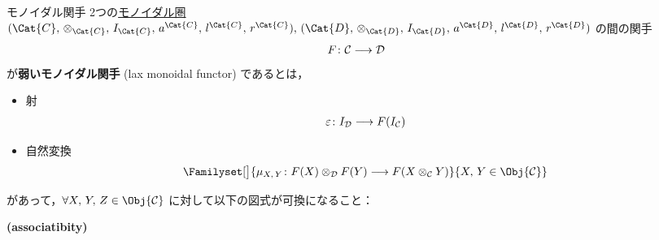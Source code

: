 \documentclass[TQFT_main]{subfiles}
\begin{document}
\begin{mydef}[label=redef:monidal-functor,breakable]{モノイダル関手}
    2つの\hyperref[def:monoidal-category]{モノイダル圏} $(\Cat{C},\, \otimes_{\Cat{C}},\, I_{\Cat{C}},\, a^{\Cat{C}},\, l^{\Cat{C}},\, r^{\Cat{C}}),\, (\Cat{D},\, \otimes_{\Cat{D}},\, I_{\Cat{D}},\, a^{\Cat{D}},\, l^{\Cat{D}},\, r^{\Cat{D}})$ の間の関手
    \begin{align}
        F \colon \mathcal{C} \longrightarrow \mathcal{D}
    \end{align}
    が\textbf{弱いモノイダル関手} (lax monoidal functor) であるとは，
    \begin{itemize}
        \item 射
        \begin{align}
            \varepsilon \colon I_{\mathcal{D}} \longrightarrow F(I_{\mathcal{C}})
        \end{align}
        
        \item 自然変換
        \begin{align}
            \Familyset[\big]{\mu_{X,\, Y} \colon F(X) \otimes_{\mathcal{D}} F(Y) \lto F(X \otimes_{\mathcal{C}} Y)}{X,\, Y \in \Obj{\mathcal{C}}}
        \end{align}
    \end{itemize}
    があって，$\forall X,\, Y,\, Z \in \Obj{\mathcal{C}}$ に対して以下の図式が可換になること：
    \begin{description}
        \item[\textbf{(associatibity)}]　
        
        \begin{center}
        \end{center}
        

\end{description}
\end{mydef}
\end{document}
